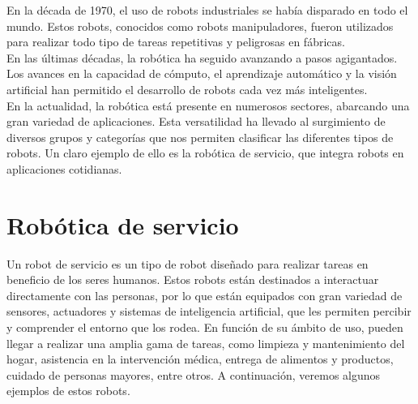 En la década de 1970, el uso de robots industriales se había disparado en todo el mundo. Estos robots, conocidos como robots manipuladores, fueron utilizados para 
realizar todo tipo de tareas repetitivas y peligrosas en fábricas.
\\
\indent En las últimas décadas, la robótica ha seguido avanzando a pasos agigantados. Los avances en la capacidad de cómputo, el aprendizaje automático y la visión 
artificial han permitido el desarrollo de robots cada vez más inteligentes.
\\

\indent En la actualidad, la robótica está presente en numerosos sectores, abarcando una gran variedad de aplicaciones. Esta versatilidad ha llevado al surgimiento 
de diversos grupos y categorías que nos permiten clasificar las diferentes tipos de robots. Un claro ejemplo de ello es la robótica 
de servicio, que integra robots en aplicaciones cotidianas.
\newpage

\section{Robótica de servicio}
\noindent Un robot de servicio es un tipo de robot diseñado para realizar tareas en beneficio de los seres humanos. Estos robots están 
destinados a interactuar directamente con las personas, por lo que están equipados con gran variedad de sensores, actuadores y sistemas de 
inteligencia artificial, que les permiten percibir y comprender el entorno que los rodea. 
En función de su ámbito de uso, pueden llegar a realizar una amplia gama de tareas, como limpieza y mantenimiento del hogar, 
asistencia en la intervención médica, entrega de alimentos y productos, cuidado de personas mayores, entre otros. A continuación, 
veremos algunos ejemplos de estos robots.

